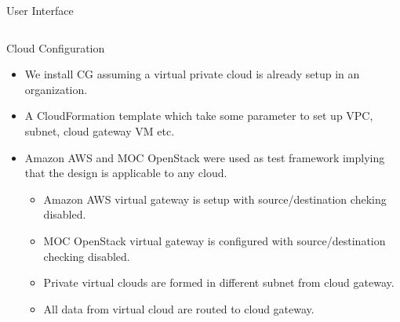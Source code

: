 \documentclass[final]{beamer}
\newlength{\onecolwid}
\newlength{\twocolwid}
\begin{document}
\begin{frame}[t]
\begin{columns}[t]
\begin{column}{\twocolwid}
\begin{columns}[t,totalwidth=\twocolwid]
\begin{column}{\onecolwid}
\begin{block}{User Interface}
\end{block}


\end{column} %

\end{columns} %





\begin{columns}[t,totalwidth=\twocolwid] %

\begin{column}{\onecolwid} %


\begin{block}{Cloud Configuration}

\begin{itemize}
\item We install CG assuming a virtual private cloud is already setup in an organization. 
\item A CloudFormation template which take some parameter to set up VPC, subnet, cloud gateway VM etc.
\item Amazon AWS and MOC OpenStack were used as test framework implying that the design is applicable to any cloud.
\begin{itemize}
\item Amazon AWS virtual gateway is setup with source/destination cheking disabled.
\item MOC OpenStack virtual gateway is configured with source/destination checking disabled.
\item Private virtual clouds are formed in different subnet from cloud gateway.
\item All data from virtual cloud are routed to cloud gateway.
\end{itemize}
\end{itemize}


\end{block}
\end{column}
\end{columns}
\end{column}
\end{columns}
\end{frame}
\end{document}
